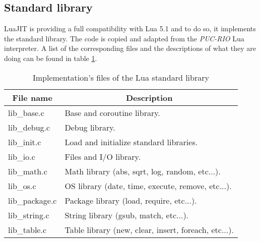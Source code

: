 
\subsection{Standard library}
\label{Subsec:std-lib}

LuaJIT is providing a full compatibility with Lua 5.1 and to do so, it
implements the standard library. The code is copied and adapted from the
\emph{PUC-RIO} Lua interpreter. A list of the corresponding files and the
descriptions of what they are doing can be found in table
\ref{tab:library-std-files}.

\begin{table}[H]
\centering
\caption{Implementation's files of the Lua standard library}
\label{tab:library-std-files}
\begin{tabular}{|l|l|}
\hline
\multicolumn{1}{|c|}{File name} & \multicolumn{1}{c|}{Description}                     \\ \hline
lib\_base.c                     & Base and coroutine library.                          \\
lib\_debug.c                    & Debug library.                                       \\
lib\_init.c                     & Load and initialize standard libraries.              \\
lib\_io.c                       & Files and I/O library.                               \\
lib\_math.c                     & Math library (abs, sqrt, log, random, etc...).       \\
lib\_os.c                       & OS library (date, time, execute, remove, etc...).    \\
lib\_package.c                  & Package library (load, require, etc...).             \\
lib\_string.c                   & String library (gsub, match, etc...).                \\
lib\_table.c                    & Table library (new, clear, insert, foreach, etc...). \\ \hline
\end{tabular}
\end{table}


